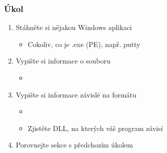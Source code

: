 \begin{frame}
  \frametitle{Úkol}

  \begin{enumerate}
    \item Stáhněte si nějakou Windows aplikaci
    \begin{itemize}
      \item Cokoliv, co je .exe (PE), např. putty
    \end{itemize}
    \item Vypište si informace o souboru
    \begin{itemize}
      \item {}
    \end{itemize}
    \item Vypište si informace závislé na formátu
    \begin{itemize}
      \item {}
      \item Zjistěte DLL, na kterých váš program závisí
    \end{itemize}
    \item Porovnejte sekce s předchozím úkolem
  \end{enumerate}

\end{frame}


